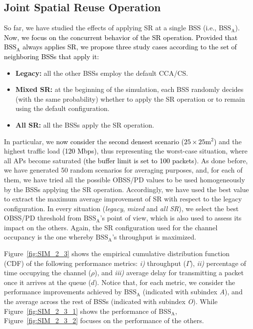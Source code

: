 \documentclass[preprint,12pt]{elsarticle}
\theoremstyle{plain}
\begin{document}
\subsection{Joint Spatial Reuse Operation}
\label{section:random_scenarios_collaborative}

So far, we have studied the effects of applying SR at a single BSS (i.e., $\text{BSS}_\text{A}$). \textcolor{black}{Now, we focus on the concurrent behavior of the SR operation. Provided that $\text{BSS}_\text{A}$ always applies SR, we propose three study cases according to the set of \textcolor{black}{neighboring BSSs} that apply it: }
\begin{itemize}
	\item \textbf{Legacy:} all the other BSSs employ the default CCA/CS.
	\item \textbf{Mixed SR:} at the beginning of the simulation, each BSS randomly decides (with the same probability) whether to apply the SR operation or to remain using the default configuration.
	\item \textbf{All SR:} all the BSSs apply the SR operation. 
\end{itemize}

In particular, we \textcolor{black}{now consider} the \textcolor{black}{second densest scenario ($25\times25$m$^2$)} and the highest traffic load \textcolor{black}{(120 Mbps)}, thus representing the worst-case situation, where all APs become saturated \textcolor{black}{(the buffer limit is set to 100 packets)}. As done before, we have generated 50 random scenarios for averaging purposes, and, for each of them, we have tried all the possible OBSS/PD values to be used homogeneously by the BSSs applying the SR operation. Accordingly, we have used the best value to extract the maximum average improvement of SR with respect to the legacy configuration. In every situation (\emph{legacy}, \emph{mixed} and \emph{all SR}), we select the best OBSS/PD threshold from $\text{BSS}_\text{A}$'s point of view, which is also used to assess its impact on the others. Again, the SR configuration used for the channel occupancy is the one whereby $\text{BSS}_\text{A}$'s throughput is maximized.

Figure~\ref{fig:SIM_2_3} shows the empirical cumulative distribution function (CDF) of the following performance metrics: \emph{i)} throughput ($\Gamma$), \emph{ii)} percentage of time occupying the channel ($\rho$), and \emph{iii)} average delay for transmitting a packet once it arrives at the queue ($d$). Notice that, for each metric, we consider the performance improvements achieved by $\text{BSS}_\text{A}$ (indicated with subindex \emph{A}), and the average across the rest of BSSs (indicated with subindex \emph{O}). While Figure~\ref{fig:SIM_2_3_1} shows the performance of BSS$_\text{A}$, Figure~\ref{fig:SIM_2_3_2} focuses on the performance of the others.
\end{document}
